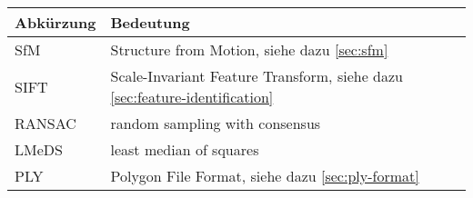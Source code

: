 


\begin{table}[h!]
    \begin{tabularx}{\textwidth}{l X}
        \toprule 
        Abkürzung & Bedeutung \\
        \midrule
        SfM & Structure from Motion, siehe dazu \autoref{sec:sfm} \nameref{sec:sfm}\\
        SIFT & Scale-Invariant Feature Transform, siehe dazu \autoref{sec:feature-identification} \nameref{sec:feature-identification}\\
        RANSAC & random sampling with consensus \\
        LMeDS & least median of squares \\
        PLY & Polygon File Format, siehe dazu \autoref{sec:ply-format} \nameref{sec:plyformat}\\
        \bottomrule 
    \end{tabularx}
\end{table}
